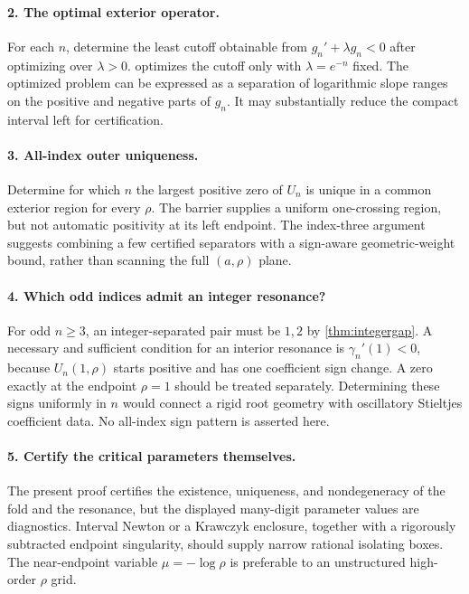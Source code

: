 \documentclass[11pt]{article}
\numberwithin{equation}{section}
\theoremstyle{definition}
\begin{document}
\paragraph{2. The optimal exterior operator.}
For each $n$, determine the least cutoff obtainable from
$g_n'+\lambda g_n<0$ after optimizing over $\lambda>0$.
 optimizes the cutoff only with $\lambda=e^{-n}$ fixed.
The optimized problem can be expressed as a separation of logarithmic
slope ranges on the positive and negative parts of $g_n$.
It may substantially reduce the compact interval left for certification.

\paragraph{3. All-index outer uniqueness.}
Determine for which $n$ the largest positive zero of $U_n$ is unique in a
common exterior region for every $\rho$. The barrier supplies a uniform
one-crossing region, but not automatic positivity at its left endpoint.
The index-three argument suggests combining a few certified separators
with a sign-aware geometric-weight bound, rather than scanning the full
$(a,\rho)$ plane.

\paragraph{4. Which odd indices admit an integer resonance?}
For odd $n\geq3$, an integer-separated pair must be $1,2$ by
\cref{thm:integergap}. A necessary and sufficient condition for an interior
resonance is $\gamma_n'(1)<0$, because $U_n(1,\rho)$ starts positive
and has one coefficient sign change. A zero exactly at the endpoint
$\rho=1$ should be treated separately. Determining these signs uniformly
in $n$ would connect a rigid root geometry with oscillatory Stieltjes
coefficient data. No all-index sign pattern is asserted here.

\paragraph{5. Certify the critical parameters themselves.}
The present proof certifies the existence, uniqueness, and nondegeneracy
of the fold and the resonance, but the displayed many-digit parameter
values are diagnostics. Interval Newton or a Krawczyk enclosure, together
with a rigorously subtracted endpoint singularity, should supply narrow
rational isolating boxes. The near-endpoint variable $\mu=-\log\rho$ is
preferable to an unstructured high-order $\rho$ grid.
\end{document}
